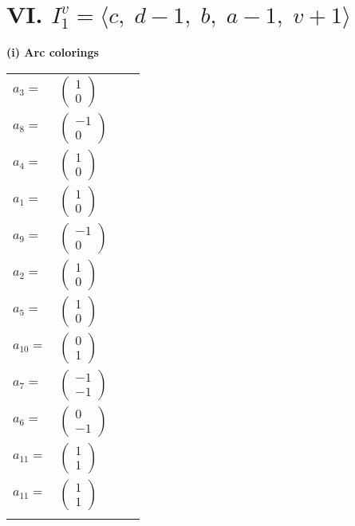 \documentclass[1p]{elsarticle_modified}
\theoremstyle{definition}
\begin{document}
\centering \section*{VI. $I^v_{1}= \langle c,\;d-1,\;b,\;a-1,\;v+1 \rangle$}
\flushleft \textbf{(i) Arc colorings}\\
\begin{tabular}{m{7pt} m{180pt} m{7pt} m{180pt} }
\flushright $a_{3}=$&$\begin{pmatrix}1\\0\end{pmatrix}$ \\
\flushright $a_{8}=$&$\begin{pmatrix}-1\\0\end{pmatrix}$ \\
\flushright $a_{4}=$&$\begin{pmatrix}1\\0\end{pmatrix}$ \\
\flushright $a_{1}=$&$\begin{pmatrix}1\\0\end{pmatrix}$ \\
\flushright $a_{9}=$&$\begin{pmatrix}-1\\0\end{pmatrix}$ \\
\flushright $a_{2}=$&$\begin{pmatrix}1\\0\end{pmatrix}$ \\
\flushright $a_{5}=$&$\begin{pmatrix}1\\0\end{pmatrix}$ \\
\flushright $a_{10}=$&$\begin{pmatrix}0\\1\end{pmatrix}$ \\
\flushright $a_{7}=$&$\begin{pmatrix}-1\\-1\end{pmatrix}$ \\
\flushright $a_{6}=$&$\begin{pmatrix}0\\-1\end{pmatrix}$ \\
\flushright $a_{11}=$&$\begin{pmatrix}1\\1\end{pmatrix}$\\ \flushright $a_{11}=$&$\begin{pmatrix}1\\1\end{pmatrix}$\\&\end{tabular}
\end{document}
